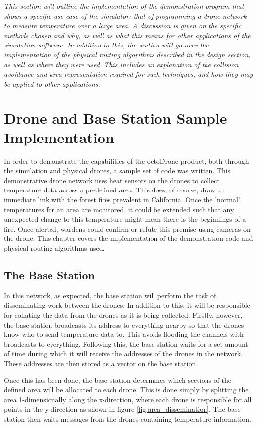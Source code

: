 \emph{This section will outline the implementation of the demonstration program that shows a specific use case of the simulator: that of programming a drone network to measure temperature over a large area. A discussion is given on the specific methods chosen and why, as well as what this means for other applications of the simulation software. In addition to this, the section will go over the implementation of the physical routing algorithms described in the design section, as well as where they were used. This includes an explanation of the collision avoidance and area representation required for such techniques, and how they may be applied to other applications.}

\section{Drone and Base Station Sample Implementation}
In order to demonstrate the capabilities of the octoDrone product, both through the simulation and physical drones, a sample set of code was written. This demonstrative drone network uses heat sensors on the drones to collect temperature data across a predefined area. This does, of course, draw an immediate link with the forest fires prevalent in California. Once the 'normal' temperatures for an area are monitored, it could be extended such that any unexpected change to this temperature might mean there is the beginnings of a fire. Once alerted, wardens could confirm or refute this premise using cameras on the drone. This chapter covers the implementation of the demonstration code and physical routing algorithms used.

\subsection{The Base Station}
In this network, as expected, the base station will perform the task of disseminating work between the drones. In addition to this, it will be responsible for collating the data from the drones as it is being collected. Firstly, however, the base station broadcasts its address to everything nearby so that the drones know who to send temperature data to. This avoids flooding the channels with broadcasts to everything. Following this, the base station waits for a set amount of time during which it will receive the addresses of the drones in the network. These addresses are then stored as a vector on the base station.

Once this has been done, the base station determines which sections of the defined area will be allocated to each drone. This is done simply by splitting the area 1-dimensionally along the x-direction, where each drone is responsible for all points in the y-direction as shown in figure \ref{fig:area_dissemination}. The base station then waits messages from the drones containing temperature information.

